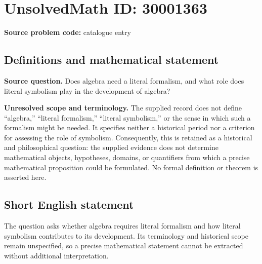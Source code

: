 \documentclass[11pt]{article}
\begin{document}
\section*{UnsolvedMath ID: 30001363}
\textbf{Source problem code:} catalogue entry
\subsection{Definitions and mathematical statement}
\textbf{Source question.} Does algebra need a literal formalism, and what role does literal symbolism play in the development of algebra?

\textbf{Unresolved scope and terminology.} The supplied record does not define ``algebra,'' ``literal formalism,'' ``literal symbolism,'' or the sense in which such a formalism might be needed. It specifies neither a historical period nor a criterion for assessing the role of symbolism. Consequently, this is retained as a historical and philosophical question: the supplied evidence does not determine mathematical objects, hypotheses, domains, or quantifiers from which a precise mathematical proposition could be formulated. No formal definition or theorem is asserted here.
\subsection{Short English statement}
The question asks whether algebra requires literal formalism and how literal symbolism contributes to its development. Its terminology and historical scope remain unspecified, so a precise mathematical statement cannot be extracted without additional interpretation.
\end{document}
